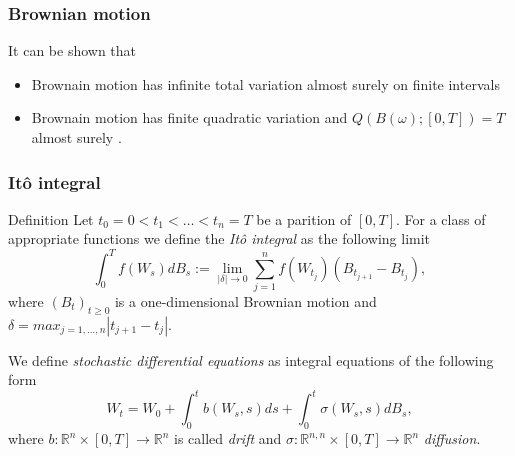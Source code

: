 \documentclass[17pt,institute=e10]{tuhh_presentation}
\newcommand{\R}{\mathbb{R}}
\begin{document}
\begin{frame}[fragile]
  \frametitle{Brownian motion}
  It can be shown that 
  \begin{itemize}
    \item Brownain motion has infinite total variation almost surely on finite intervals
    \item Brownain motion has finite quadratic variation and $Q(B(\omega);[0,T]) = T$ almost surely \autocite{eAppliedStochasticAnalysis2021}.
  \end{itemize}
\end{frame}
\begin{frame}
  \frametitle{Itô integral}

  \begin{block}{Definition \autocite{eAppliedStochasticAnalysis2021}}
    Let $t_0 = 0 < t_1 < \dots < t_n = T$ be a parition of $[0,T]$.
    For a class of appropriate functions we define the \emph{\textcolor{purple-pontifex}{Itô integral}} as the following limit
\begin{equation*}
  \int_0^T f(W_s) dB_s := \lim\limits_{|\delta| \rightarrow 0} \sum_{j=1}^n f(W_{t_j})(B_{t_{j+1}} - B_{t_j}),
\end{equation*}
where $(B_t)_{t \geq 0}$ is a one-dimensional Brownian motion and\;$\delta = max_{j =1,\dots,n} |t_{j+1} - t_j|$.
\end{block}

\end{frame}
\begin{frame}
We define \emph{\textcolor{purple-pontifex}{stochastic differential equations}} as integral equations of the following form
\begin{equation*}
  W_t = W_0 + \int_0^t b(W_s,s) ds + \int_0^t \sigma(W_s, s) dB_s,
\end{equation*}
where $b : \R^n \times [0,T] \rightarrow \R^n$ is called \emph{\textcolor{purple-pontifex}{drift}} and $\sigma : \R^{n,n} \times [0,T] \rightarrow \R^n$ \emph{\textcolor{purple-pontifex}{diffusion}}.
\end{frame}
\end{document}
